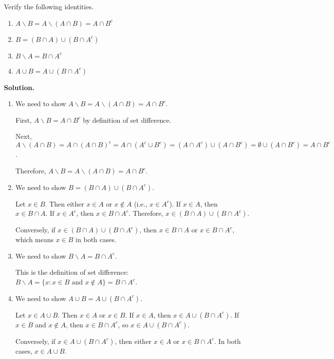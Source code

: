 \begin{problembox}
Verify the following identities.
\begin{enumerate}[label=(\alph*)]
    \item $A \backslash B = A \backslash (A \cap B) = A \cap B^c$
    \item $B = (B \cap A) \cup (B \cap A^c)$
    \item $B \backslash A = B \cap A^c$
    \item $A \cup B = A \cup (B \cap A^c)$
\end{enumerate}

\end{problembox}

\noindent\textbf{Solution.}
\begin{enumerate}[label=(\alph*)]
    \item We need to show $A \backslash B = A \backslash (A \cap B) = A \cap B^c$.
    
    First, $A \backslash B = A \cap B^c$ by definition of set difference.
    
    Next, $A \backslash (A \cap B) = A \cap (A \cap B)^c = A \cap (A^c \cup B^c) = (A \cap A^c) \cup (A \cap B^c) = \emptyset \cup (A \cap B^c) = A \cap B^c$.
    
    Therefore, $A \backslash B = A \backslash (A \cap B) = A \cap B^c$.
    
    \item We need to show $B = (B \cap A) \cup (B \cap A^c)$.
    
    Let $x \in B$. Then either $x \in A$ or $x \notin A$ (i.e., $x \in A^c$). If $x \in A$, then $x \in B \cap A$. If $x \in A^c$, then $x \in B \cap A^c$. Therefore, $x \in (B \cap A) \cup (B \cap A^c)$.
    
    Conversely, if $x \in (B \cap A) \cup (B \cap A^c)$, then $x \in B \cap A$ or $x \in B \cap A^c$, which means $x \in B$ in both cases.
    
    \item We need to show $B \backslash A = B \cap A^c$.
    
    This is the definition of set difference: $B \backslash A = \{x : x \in B \text{ and } x \notin A\} = B \cap A^c$.
    
    \item We need to show $A \cup B = A \cup (B \cap A^c)$.
    
    Let $x \in A \cup B$. Then $x \in A$ or $x \in B$. If $x \in A$, then $x \in A \cup (B \cap A^c)$. If $x \in B$ and $x \notin A$, then $x \in B \cap A^c$, so $x \in A \cup (B \cap A^c)$.
    
    Conversely, if $x \in A \cup (B \cap A^c)$, then either $x \in A$ or $x \in B \cap A^c$. In both cases, $x \in A \cup B$.
\end{enumerate}

